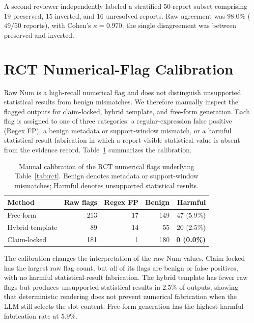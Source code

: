 \documentclass[10pt,twocolumn]{article}
\begin{document}
A second reviewer independently labeled a stratified $50$-report subset comprising $19$ preserved, $15$ inverted, and $16$ unresolved reports. Raw agreement was $98.0\%$ ($49/50$ reports), with Cohen's $\kappa=0.970$; the single disagreement was between preserved and inverted.

\section{RCT Numerical-Flag Calibration}
\label{app:rct-num-calibration}

Raw Num is a high-recall numerical flag and does not distinguish unsupported statistical results from benign mismatches. We therefore manually inspect the flagged outputs for claim-locked, hybrid template, and free-form generation. Each flag is assigned to one of three categories: a regular-expression false positive (Regex FP), a benign metadata or support-window mismatch, or a harmful statistical-result fabrication in which a report-visible statistical value is absent from the evidence record. Table~\ref{tab:rct-num-calibration} summarizes the calibration.

\begin{table}[h]
	\centering
	\footnotesize
	\setlength{\tabcolsep}{3pt}
	\caption{Manual calibration of the RCT numerical flags underlying Table~\ref{tab:rct}. Benign denotes metadata or support-window mismatches; Harmful denotes unsupported statistical results.}
	\label{tab:rct-num-calibration}
	\begin{tabular}{lrrrr}
		\toprule
		Method & Raw flags & Regex FP & Benign & Harmful \\
		\midrule
		Free-form       & 213 & 17 & 149 & 47 (5.9\%) \\
		Hybrid template & 89  & 14 & 55  & 20 (2.5\%) \\
		Claim-locked    & 181 & 1  & 180 & \textbf{0 (0.0\%)} \\
		\bottomrule
	\end{tabular}
\end{table}
The calibration changes the interpretation of the raw Num values. Claim-locked has the largest raw flag count, but all of its flags are benign or false positives, with no harmful statistical-result fabrication. The hybrid template has fewer raw flags but produces unsupported statistical results in $2.5\%$ of outputs, showing that deterministic rendering does not prevent numerical fabrication when the LLM still selects the slot content. Free-form generation has the highest harmful-fabrication rate at $5.9\%$.
\end{document}
